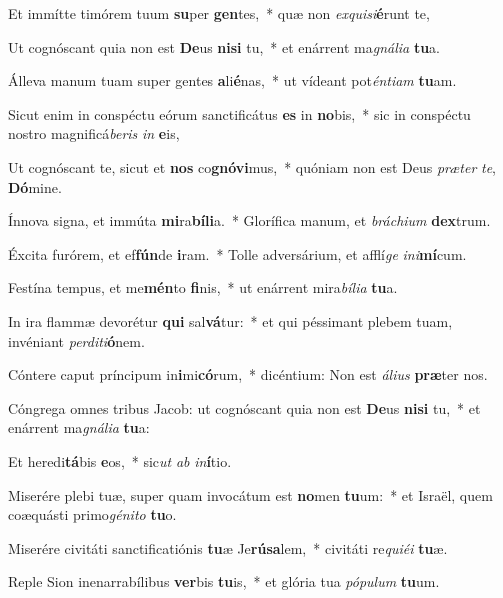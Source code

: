 \item Et immítte timórem tuum \textbf{su}per \textbf{gen}tes,~* quæ non \textit{ex}\textit{qui}\textit{si}\textbf{é}runt te,
\item Ut cognóscant quia non est \textbf{De}us \textbf{ni}\textbf{si} tu,~* et enárrent ma\textit{gná}\textit{li}\textit{a} \textbf{tu}a.
\item Álleva manum tuam super gentes \textbf{a}li\textbf{é}nas,~* ut vídeant pot\textit{én}\textit{ti}\textit{am} \textbf{tu}am.
\item Sicut enim in conspéctu eórum sanctificátus \textbf{es} in \textbf{no}bis,~* sic in conspéctu nostro magnificá\textit{be}\textit{ris} \textit{in} \textbf{e}is,
\item Ut cognóscant te, sicut et \textbf{nos} co\textbf{gnó}\textbf{vi}mus,~* quóniam non est Deus \textit{præ}\textit{ter} \textit{te}, \textbf{Dó}mine.
\item Ínnova signa, et immúta \textbf{mi}ra\textbf{bí}\textbf{li}a.~* Glorífica manum, et \textit{brá}\textit{chi}\textit{um} \textbf{dex}trum.
\item Éxcita furórem, et ef\textbf{fún}de \textbf{i}ram.~* Tolle adversárium, et afflí\textit{ge} \textit{in}\textit{i}\textbf{mí}cum.
\item Festína tempus, et me\textbf{mén}to \textbf{fi}nis,~* ut enárrent mira\textit{bí}\textit{li}\textit{a} \textbf{tu}a.
\item In ira flammæ devorétur \textbf{qui} sal\textbf{vá}tur:~* et qui péssimant plebem tuam, invéniant \textit{per}\textit{di}\textit{ti}\textbf{ó}nem.
\item Cóntere caput príncipum in\textbf{i}mi\textbf{có}rum,~* dicéntium: Non est \textit{á}\textit{li}\textit{us} \textbf{præ}ter nos.
\item Cóngrega omnes tribus Jacob: ut cognóscant quia non est \textbf{De}us \textbf{ni}\textbf{si} tu,~* et enárrent ma\textit{gná}\textit{li}\textit{a} \textbf{tu}a:
\item Et heredi\textbf{tá}bis \textbf{e}os,~* sic\textit{ut} \textit{ab} \textit{in}\textbf{í}tio.
\item Miserére plebi tuæ, super quam invocátum est \textbf{no}men \textbf{tu}um:~* et Israël, quem coæquásti primo\textit{gé}\textit{ni}\textit{to} \textbf{tu}o.
\item Miserére civitáti sanctificatiónis \textbf{tu}æ Je\textbf{rú}\textbf{sa}lem,~* civitáti re\textit{qui}\textit{é}\textit{i} \textbf{tu}æ.
\item Reple Sion inenarrabílibus \textbf{ver}bis \textbf{tu}is,~* et glória tua \textit{pó}\textit{pu}\textit{lum} \textbf{tu}um.
